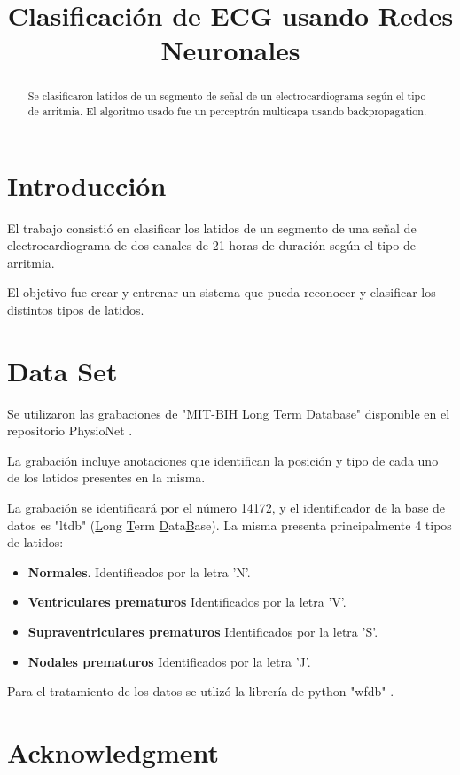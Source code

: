 \documentclass[conference]{IEEEtran}
\theoremstyle{definition}
\begin{document}
\title{Clasificación de ECG usando Redes Neuronales}

\author{
	}
\maketitle


\begin{abstract}
	Se clasificaron latidos de un segmento de señal de un electrocardiograma según el tipo de arritmia. El algoritmo usado fue un perceptrón multicapa usando backpropagation.
\end{abstract}

\section{\textbf{Introducci\'{o}n}}

El trabajo consistió en clasificar los latidos de un segmento de una señal de electrocardiograma de dos canales de 21 horas de duración según el tipo de arritmia.

El objetivo fue crear y entrenar un sistema que pueda reconocer y clasificar los distintos tipos de latidos.

\section{Data Set}

Se utilizaron las grabaciones de "MIT-BIH Long Term Database" \cite{MIT-BIH} disponible en el repositorio PhysioNet \cite{PHYSIONET}.

La grabación incluye anotaciones que identifican la posición y tipo de cada uno de los latidos presentes en la misma.

La grabación se identificará por el número 14172, y el identificador de la base de datos es "ltdb" (\underline{L}ong \underline{T}erm \underline{D}ata\underline{B}ase).
La misma presenta principalmente 4 tipos de latidos:

\begin{itemize}
	\item \textbf{Normales}. Identificados por la letra 'N'.
	\item \textbf{Ventriculares prematuros} Identificados por la letra 'V'.
	\item \textbf{Supraventriculares prematuros} Identificados por la letra 'S'.
	\item \textbf{Nodales prematuros} Identificados por la letra 'J'.
\end{itemize}

Para el tratamiento de los datos se utlizó la librería de python "wfdb" \cite{WFDB}.

\IEEEpeerreviewmaketitle

\section*{\textbf{Acknowledgment}}

\newpage



\end{document}

